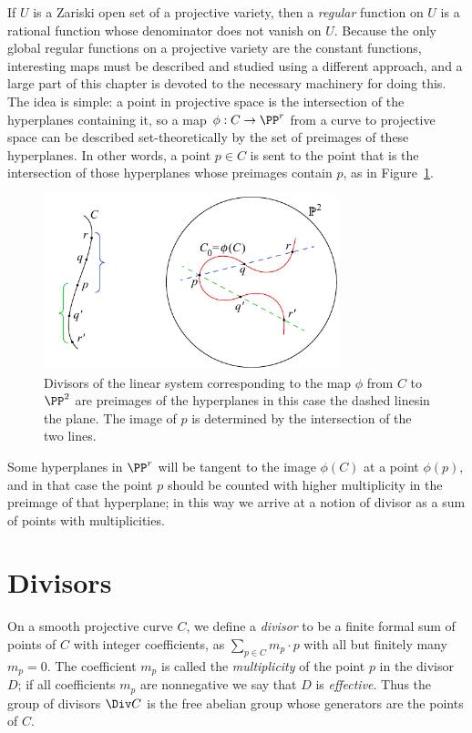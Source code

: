 If $U$ is a Zariski open set of a projective variety, then a \emph{regular} function on $U$
is a rational function whose denominator does not vanish on $U$.
Because the only global regular functions on a projective variety are the  constant functions, 
interesting maps must be described and studied using
a different approach, and a large part of this chapter is devoted to the necessary machinery for doing this. The idea is simple: a point in projective space is the intersection of the hyperplanes containing it, so a map $\phi: C\to \PP^r$ from a curve to projective space can be described set-theoretically
by the set of preimages of these hyperplanes. 
In other words, a point $p\in C$ is sent to the point
that is the intersection of those hyperplanes whose preimages contain $p$, as in Figure~\ref{set-theoretic map}.
 
\begin{figure}[b]
\centerline {\includegraphics[height=2in]{"main/Fig01-1"}}
 \caption{Divisors of the linear system corresponding to the map
   $\phi$ from $C$ 
to $\PP^2$ are preimages of the hyperplanes\emdash
   in this case the dashed lines\emdash in the plane.
 The image of $p$ is determined by the intersection of the two lines.
}
\label{set-theoretic map}
\end{figure}


Some hyperplanes in $\PP^{r}$ will be tangent to the image $\phi(C)$ at a point $\phi(p)$, and in that case the point $p$ should be counted with higher multiplicity in the preimage of that hyperplane; in
this way we arrive at a notion of divisor as a sum of points with multiplicities.

\section{Divisors}

On a smooth projective curve $C$, we define a \emph{divisor} to be a
finite formal sum of points of $C$ with integer coefficients, 
as $\sum_{p\in C} m_p\cdot p$ with all but
finitely many $m_p=0$.  The coefficient $m_p$ is called the
\emph{multiplicity} of the point $p$ in the divisor $D$; if all
coefficients $m_p$ are nonnegative we say that $D$ is
\emph{effective}. Thus the group of divisors $\Div C$ is the free
abelian group whose generators
%
%
%
are the points of $C$.


